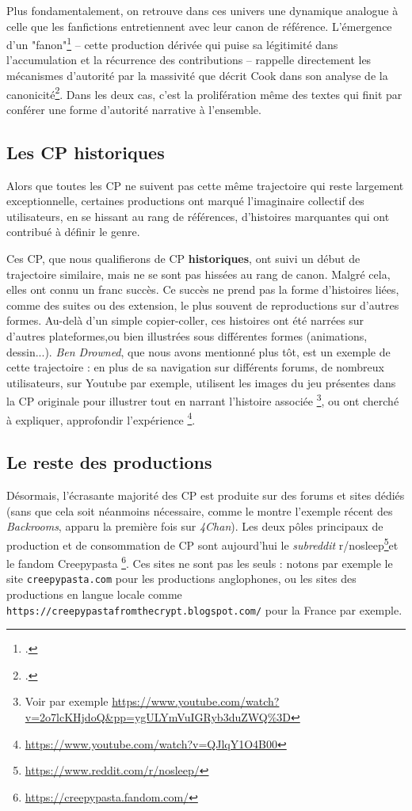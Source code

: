 \documentclass[12pt,a4paper,oneside,titlepage]{book} %
\begin{document}
Plus fondamentalement, on retrouve dans ces univers une dynamique analogue à celle que les fanfictions entretiennent avec leur canon de référence. L'émergence d'un "fanon"\footcite{lata_du_2022} – cette production dérivée qui puise sa légitimité dans l'accumulation et la récurrence des contributions – rappelle directement les mécanismes d'autorité par la massivité que décrit Cook dans son analyse de la canonicité\footcite{cook_canonicity_2013}. Dans les deux cas, c'est la prolifération même des textes qui finit par conférer une forme d'autorité narrative à l'ensemble.

\subsection{Les CP historiques}
\label{cp_historique}

Alors que toutes les CP ne suivent pas cette même trajectoire qui reste largement exceptionnelle, certaines productions ont  marqué l'imaginaire collectif des utilisateurs, en se hissant au rang de références, d'histoires marquantes qui ont contribué à définir le genre. 

Ces CP, que nous qualifierons de CP \textbf{historiques}, ont suivi un début de trajectoire similaire, mais ne se sont pas hissées au rang de canon. Malgré cela, elles ont connu un franc succès. 
Ce succès ne prend pas la forme d'histoires liées, comme des suites ou des extension, le plus souvent de reproductions sur d'autres formes. Au-delà d'un simple copier-coller, ces histoires ont été narrées sur d'autres plateformes,ou bien illustrées sous différentes formes (animations, dessin...). 
\textit{Ben Drowned}, que nous avons mentionné plus tôt, est un exemple de cette trajectoire : en plus de sa navigation sur différents forums, de nombreux utilisateurs, sur Youtube par exemple, utilisent les images du jeu présentes dans la CP originale pour illustrer tout en narrant l'histoire associée \footnote{Voir par exemple \url{https://www.youtube.com/watch?v=2o7lcKHjdoQ\&pp=ygULYmVuIGRyb3duZWQ\%3D}}, ou ont cherché à expliquer, approfondir l'expérience \footnote{\url{https://www.youtube.com/watch?v=QJlqY1O4B00}}.


\subsection{Le reste des productions}


Désormais, l'écrasante majorité des CP est produite sur des forums et sites dédiés (sans que cela soit néanmoins nécessaire, comme le montre l'exemple récent des \textit{Backrooms}, apparu la première fois sur \textit{4Chan}). Les deux pôles principaux de production et de consommation de CP sont aujourd'hui le \textit{subreddit} r/nosleep\footnote{\url{https://www.reddit.com/r/nosleep/}}et le fandom Creepypasta \footnote{\url{https://creepypasta.fandom.com/}}. Ces sites ne sont pas les seuls : notons par exemple le site \verb|creepypasta.com| pour les productions anglophones, ou les sites des productions en langue locale comme \texttt{https://creepypastafromthecrypt.blogspot.com/} pour la France par exemple.
\end{document}
